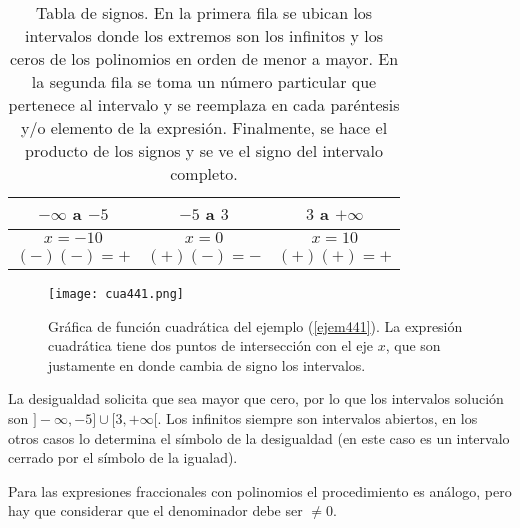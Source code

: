 \begin{center}
	\begin{table}[h!]
	\centering
		\begin{tabular}{|c|c|c|}
\hline
$-\infty$ a $-5$ &$-5$ a $3$ &$3$ a $+\infty$ \\
\hline
$x=-10$ & $x=0$ & $x=10$\\
$(-)(-)=+$ & $(+)(-)=-$ & $(+)(+)=+$ \\
\hline
		\end{tabular}
		\caption[Tabla de signos.]{Tabla de signos. En la primera fila se ubican los intervalos donde los extremos son los infinitos y los ceros de los polinomios en orden de menor a mayor. En la segunda fila se toma un número particular que pertenece al intervalo y se reemplaza en cada paréntesis y/o elemento de la expresión. Finalmente, se hace el producto de los signos y se ve el signo del intervalo completo.}
	\end{table}
\end{center}

\begin{center}
\begin{figure}[h!]
\centering
\texttt{[image: cua441.png]}
\caption[Gráfica de función cuadrática del ejemplo (\ref{ejem441}).]{Gráfica de función cuadrática del ejemplo (\ref{ejem441}). La expresión cuadrática tiene dos puntos de intersección con el eje $x$, que son justamente en donde cambia de signo los intervalos. }
\end{figure}
\end{center}
La desigualdad solicita que sea mayor que cero, por lo que los intervalos solución son $]-\infty,-5]\cup [3,+\infty[$. Los infinitos siempre son intervalos abiertos, en los otros casos lo determina el símbolo de la desigualdad (en este caso es un intervalo cerrado por el símbolo de la igualad).


Para las expresiones fraccionales con polinomios el procedimiento es análogo, pero hay que considerar que el denominador debe ser $\neq 0$.\\

